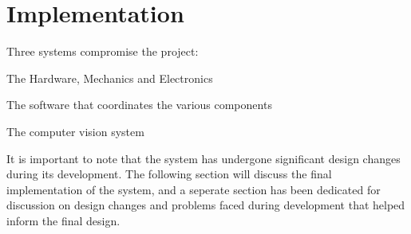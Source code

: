 \section{Implementation} \label{sec:implementation}
Three systems compromise the project:
\begin{mylist}
  \item The Hardware, Mechanics and Electronics
  \item The software that coordinates the various components
  \item The computer vision system
\end{mylist}

\noindent
It is important to note that the system has undergone significant design changes during its development. The following section
will discuss the final implementation of the system, and a seperate section has been dedicated for discussion on design changes
and problems faced during development that helped inform the final design.

